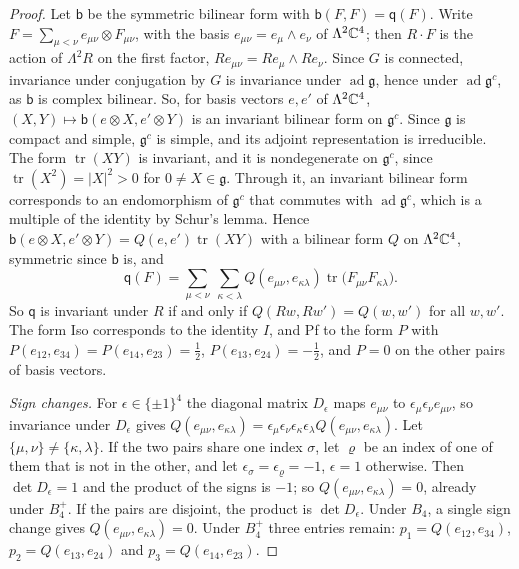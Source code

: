 \begin{proof}
Let $\mathsf b$ be the symmetric bilinear form with $\mathsf b(F,F)=\mathsf q(F)$. Write $F=\sum_{\mu<\nu}e_{\mu\nu}\otimes F_{\mu\nu}$, with the basis $e_{\mu\nu}=e_\mu\wedge e_\nu$ of $\Lambda^2\mathbb C^4$; then $R\cdot F$ is the action of $\Lambda^2R$ on the first factor, $Re_{\mu\nu}=Re_\mu\wedge Re_\nu$. Since $G$ is connected, invariance under conjugation by $G$ is invariance under $\operatorname{ad}\mathfrak g$, hence under $\operatorname{ad}\mathfrak g^c$, as $\mathsf b$ is complex bilinear. So, for basis vectors $e,e'$ of $\Lambda^2\mathbb C^4$, $(X,Y)\mapsto\mathsf b(e\otimes X,e'\otimes Y)$ is an invariant bilinear form on $\mathfrak g^c$. Since $\mathfrak g$ is compact and simple, $\mathfrak g^c$ is simple, and its adjoint representation is irreducible. The form $\operatorname{tr}(XY)$ is invariant, and it is nondegenerate on $\mathfrak g^c$, since $\operatorname{tr}(X^2)=|X|^2>0$ for $0\ne X\in\mathfrak g$. Through it, an invariant bilinear form corresponds to an endomorphism of $\mathfrak g^c$ that commutes with $\operatorname{ad}\mathfrak g^c$, which is a multiple of the identity by Schur's lemma. Hence $\mathsf b(e\otimes X,e'\otimes Y)=Q(e,e')\operatorname{tr}(XY)$ with a bilinear form $Q$ on $\Lambda^2\mathbb C^4$, symmetric since $\mathsf b$ is, and
\[
\mathsf q(F)=\sum_{\mu<\nu}\ \sum_{\kappa<\lambda}Q(e_{\mu\nu},e_{\kappa\lambda})\operatorname{tr}\big(F_{\mu\nu}F_{\kappa\lambda}\big).
\]
So $\mathsf q$ is invariant under $R$ if and only if $Q(Rw,Rw')=Q(w,w')$ for all $w,w'$. The form Iso corresponds to the identity $I$, and Pf to the form $P$ with $P(e_{12},e_{34})=P(e_{14},e_{23})=\frac12$, $P(e_{13},e_{24})=-\frac12$, and $P=0$ on the other pairs of basis vectors.

\emph{Sign changes.} For $\epsilon\in\{\pm1\}^4$ the diagonal matrix $D_\epsilon$ maps $e_{\mu\nu}$ to $\epsilon_\mu\epsilon_\nu e_{\mu\nu}$, so invariance under $D_\epsilon$ gives $Q(e_{\mu\nu},e_{\kappa\lambda})=\epsilon_\mu\epsilon_\nu\epsilon_\kappa\epsilon_\lambda Q(e_{\mu\nu},e_{\kappa\lambda})$. Let $\{\mu,\nu\}\ne\{\kappa,\lambda\}$. If the two pairs share one index $\sigma$, let $\varrho$ be an index of one of them that is not in the other, and let $\epsilon_\sigma=\epsilon_\varrho=-1$, $\epsilon=1$ otherwise. Then $\det D_\epsilon=1$ and the product of the signs is $-1$; so $Q(e_{\mu\nu},e_{\kappa\lambda})=0$, already under $B_4^+$. If the pairs are disjoint, the product is $\det D_\epsilon$. Under $B_4$, a single sign change gives $Q(e_{\mu\nu},e_{\kappa\lambda})=0$. Under $B_4^+$ three entries remain: $p_1=Q(e_{12},e_{34})$, $p_2=Q(e_{13},e_{24})$ and $p_3=Q(e_{14},e_{23})$.


\end{proof}
